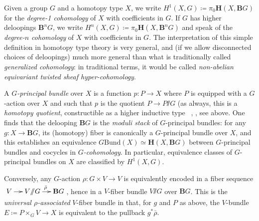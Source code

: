 \documentclass[copyright,12pt]{eptcs}
\renewcommand{\H}{\ensuremath{\mathbf{H}}\xspace}
\newcommand{\ssl}{\mathord{\sslash}}
\begin{document}
Given a group $G$ and a homotopy type $X$, we write
$
H^1(X,G) \coloneqq %
\pi_0 {\H(X,\mathbf{B}G)}
$
for the \emph{degree-1 cohomology} of $X$ with coefficients in $G$. If $G$ has higher
deloopings $\mathbf{B}^n G$, we write
$
H^n(X, G) \coloneqq %
\pi_0 {\H(X,\mathbf{B}^n G)}
$
and speak of the \emph{degree-$n$ cohomology} of $X$ with coefficients in $G$.
The interpretation of this simple definition in homotopy type theory is very general,
and (if we allow disconnected choices of deloopings) much more general than what is traditionally called \emph{generalized cohomology}:
in traditional terms, it would be called \emph{non-abelian equivariant twisted sheaf hyper-cohomology}.

A  \emph{$G$-principal bundle} over $X$ is a function $p : P \to X$ where $P$ is
equipped with a $G$-action over $X$ and such that $p$ is the quotient $P \to P\ssl G$
(as always, this is a \emph{homotopy quotient}, constructible as a higher inductive type
~\cite{ShulmanLumsdaine,hottbook},%
, see above.
One finds that the delooping $\mathbf{B}G$
is the \emph{moduli stack} of $G$-principal bundles: for any $g : X \to \mathbf{B}G$, its
(homotopy) fiber is canonically a $G$-principal bundle over $X$, and this establishes
an equivalence
$G \mathrm{Bund}(X) \simeq {\H(X,\mathbf{B}G)} $
between $G$-principal bundles and cocycles in \emph{$G$-cohomology}.
In particular, equivalence classes of $G$-principal bundles on $X$ are classified by $H^1(X,G)$.

Conversely, any $G$-action $\rho : G \times V \to V$ is equivalently encoded in
a fiber sequence
$
  \xymatrix@-1pc{
    V \ar[r] & V\ssl G \ar[r]^{\bar \rho}
  & \mathbf{B}G
  }
$,
hence in a $V$-fiber bundle $V\ssl G$ over $\mathbf{B}G$.
This is the \emph{universal $\rho$-associated} $V$-fiber bundle
in that, for $g$ and $P$ as above, the $V$-bundle $E \coloneqq P \times_G V \to X$
is equivalent to the pullback $g^* \bar \rho$.
\end{document}
